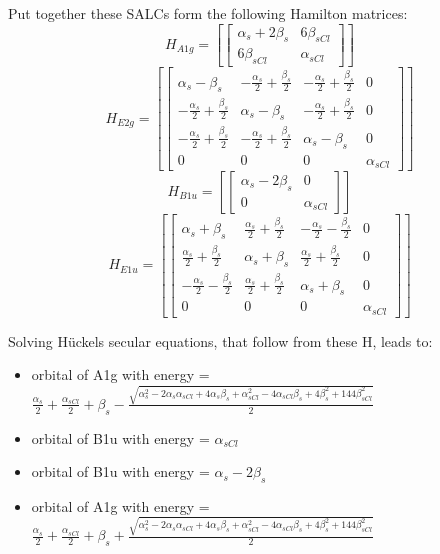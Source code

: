 \documentclass[12pt,a4paper]{article}
\begin{document}
Put together these SALCs form the following Hamilton matrices:
     $$ H_{A1g}= \left[\begin{bmatrix}\alpha_{s} + 2 \beta_{s} & 6 \beta_{s Cl}\\6 \beta_{s Cl} & \alpha_{s Cl}\end{bmatrix}\right]$$ 
     $$ H_{E2g}= \left[\begin{bmatrix}\alpha_{s} - \beta_{s} & - \frac{\alpha_{s}}{2} + \frac{\beta_{s}}{2} & - \frac{\alpha_{s}}{2} + \frac{\beta_{s}}{2} & 0\\- \frac{\alpha_{s}}{2} + \frac{\beta_{s}}{2} & \alpha_{s} - \beta_{s} & - \frac{\alpha_{s}}{2} + \frac{\beta_{s}}{2} & 0\\- \frac{\alpha_{s}}{2} + \frac{\beta_{s}}{2} & - \frac{\alpha_{s}}{2} + \frac{\beta_{s}}{2} & \alpha_{s} - \beta_{s} & 0\\0 & 0 & 0 & \alpha_{s Cl}\end{bmatrix}\right]$$ 
     $$ H_{B1u}= \left[\begin{bmatrix}\alpha_{s} - 2 \beta_{s} & 0\\0 & \alpha_{s Cl}\end{bmatrix}\right]$$ 
     $$ H_{E1u}= \left[\begin{bmatrix}\alpha_{s} + \beta_{s} & \frac{\alpha_{s}}{2} + \frac{\beta_{s}}{2} & - \frac{\alpha_{s}}{2} - \frac{\beta_{s}}{2} & 0\\\frac{\alpha_{s}}{2} + \frac{\beta_{s}}{2} & \alpha_{s} + \beta_{s} & \frac{\alpha_{s}}{2} + \frac{\beta_{s}}{2} & 0\\- \frac{\alpha_{s}}{2} - \frac{\beta_{s}}{2} & \frac{\alpha_{s}}{2} + \frac{\beta_{s}}{2} & \alpha_{s} + \beta_{s} & 0\\0 & 0 & 0 & \alpha_{s Cl}\end{bmatrix}\right]$$ 


Solving Hückels secular equations, that follow from these H, leads to:
\begin{itemize}
\item orbital of A1g with energy = $\frac{\alpha_{s}}{2} + \frac{\alpha_{s Cl}}{2} + \beta_{s} - \frac{\sqrt{\alpha_{s}^{2} - 2 \alpha_{s} \alpha_{s Cl} + 4 \alpha_{s} \beta_{s} + \alpha_{s Cl}^{2} - 4 \alpha_{s Cl} \beta_{s} + 4 \beta_{s}^{2} + 144 \beta_{s Cl}^{2}}}{2}$
\item orbital of B1u with energy = $\alpha_{s Cl}$
\item orbital of B1u with energy = $\alpha_{s} - 2 \beta_{s}$
\item orbital of A1g with energy = $\frac{\alpha_{s}}{2} + \frac{\alpha_{s Cl}}{2} + \beta_{s} + \frac{\sqrt{\alpha_{s}^{2} - 2 \alpha_{s} \alpha_{s Cl} + 4 \alpha_{s} \beta_{s} + \alpha_{s Cl}^{2} - 4 \alpha_{s Cl} \beta_{s} + 4 \beta_{s}^{2} + 144 \beta_{s Cl}^{2}}}{2}$
\end{itemize}
\end{document}
